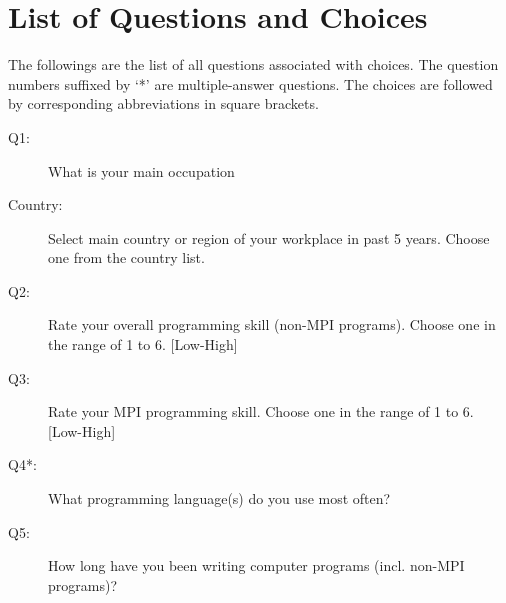 \documentclass[conference,10pt,letterpaper]{IEEEtran}
\def\myquote#1{`#1'}
\begin{document}
\appendix
\section{List of Questions and Choices}
\label{app:questions}

{\small

  The followings are the list of all questions associated with
choices. The question numbers suffixed by \myquote{*} are
multiple-answer questions. The choices are followed by corresponding
abbreviations in square brackets.
\vspace{3mm}
{\scriptsize
  \begin{description}
  \item[Q1:] What is your main occupation
  \item[Country:] \hspace{3mm}Select main country or region of your workplace in past 5 years.
    Choose one from the country list.
  \item[Q2:] Rate your overall programming skill (non-MPI programs).
    Choose one in the range of 1 to 6. [Low-High]
  \item[Q3:] Rate your MPI programming skill.
    Choose one in the range of 1 to 6. [Low-High]
  \item[Q4*:] What programming language(s) do you use most often?
  \item[Q5:] How long have you been writing computer programs (incl. non-MPI programs)?

\end{description}}}
\end{document}
